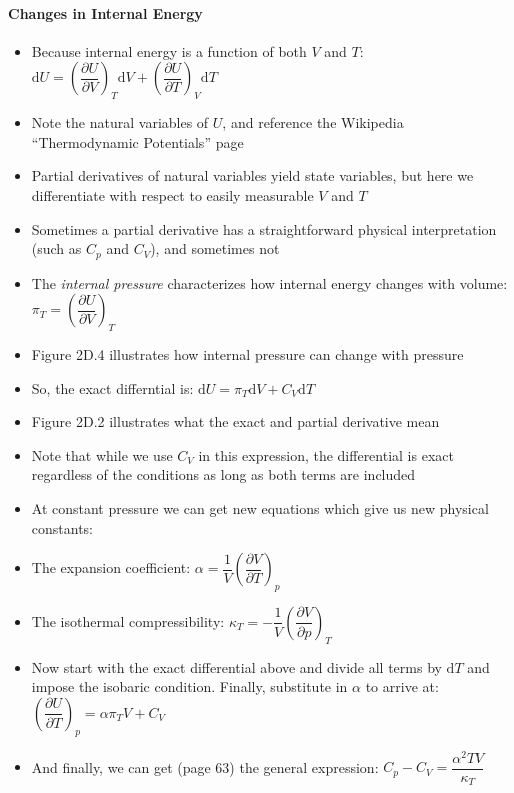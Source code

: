 \documentclass[12pt, openany, letterpaper]{memoir}
\begin{document}
\paragraph{Changes in Internal Energy}
\begin{itemize}
	\item Because internal energy is a function of both $V$ and $T$: $\mathrm{d}U = \left(\dfrac{\partial U}{\partial V}\right)_T\mathrm{d}V + \left(\dfrac{\partial U}{\partial T}\right)_V\mathrm{d}T$
	\item Note the natural variables of $U$, and reference the Wikipedia ``Thermodynamic Potentials'' page
	\item Partial derivatives of natural variables yield state variables, but here we differentiate with respect to easily measurable $V$ and $T$
	\item Sometimes a partial derivative has a straightforward physical interpretation (such as $C_p$ and $C_V$), and sometimes not
	\item The \emph{internal pressure} characterizes how internal energy changes with volume: $\pi_T = \left(\dfrac{\partial U}{\partial V}\right)_T$
	\item Figure 2D.4 illustrates how internal pressure can change with pressure
	\item So, the exact differntial is: $\mathrm{d}U = \pi_T\mathrm{d}V + C_V\mathrm{d}T$
	\item Figure 2D.2 illustrates what the exact and partial derivative mean
	\item Note that while we use $C_V$ in this expression, the differential is exact regardless of the conditions as long as both terms are included
	\item At constant pressure we can get new equations which give us new physical constants:
	\item The expansion coefficient: $\alpha = \dfrac{1}{V}\left(\dfrac{\partial V}{\partial T}\right)_p$
	\item The isothermal compressibility: $\kappa_T = -\dfrac{1}{V}\left(\dfrac{\partial V}{\partial p}\right)_T$
  \item Now start with the exact differential above and divide all terms by $\mathrm{d}T$ and impose the isobaric condition. Finally, substitute in $\alpha$ to arrive at: $\left(\dfrac{\partial U}{\partial T}\right)_p = \alpha\pi_T V + C_V$
	\item And finally, we can get (page 63) the general expression: $C_p-C_V = \dfrac{\alpha^2 TV}{\kappa_T}$
\end{itemize}
\end{document}
